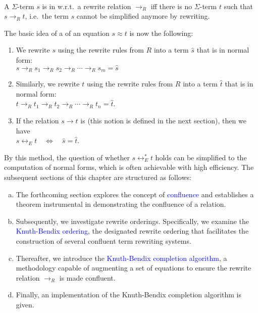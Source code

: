 \begin{Definition} \hspace*{\fill} \\
  A $\Sigma$-term $s$ is in  w.r.t.~a rewrite relation $\rightarrow_R$ iff there is no
  $\Sigma$-term $t$ such that $s \rightarrow_R t$, i.e.~the term $s$ cannot be simplified anymore by rewriting. \eod
\end{Definition}
The basic idea of a  of an equation $s \approx t$ is now the following:
\begin{enumerate}
\item We rewrite $s$ using the rewrite rules from $R$ into a term $\widehat{s}$ that is in normal form:
      \\[0.2cm]
      \hspace*{1.3cm}
      $s \rightarrow_R s_1 \rightarrow_R s_2 \rightarrow_R \cdots \rightarrow_R s_m = \widehat{s}$
\item Similarly, we rewrite $t$ using the rewrite rules from $R$ into a term $\widehat{t}$ that is in normal form:
      \\[0.2cm]
      \hspace*{1.3cm}
      $t \rightarrow_R t_1 \rightarrow_R t_2 \rightarrow_R \cdots \rightarrow_R t_n = \widehat{t}$.
\item If the relation $s \rightarrow t$ is  (this notion is defined in the next section),
      then we have 
      \\[0.2cm]
      \hspace*{1.3cm}
      $s \leftrightarrow_E t \quad \Leftrightarrow \quad \widehat{s} = \widehat{t}$.
    \end{enumerate}
By this method, the question of whether $s \leftrightarrow_E^* t$ holds can be simplified to the computation of
normal forms, which is often achievable with high efficiency. The subsequent sections of this chapter are
structured as follows: 
\begin{enumerate}[(a)]
\item The forthcoming section explores the concept of \textcolor{blue}{confluence} and establishes a theorem
      instrumental in demonstrating the confluence of a relation. 
\item Subsequently, we investigate rewrite orderings. Specifically, we examine the
      \textcolor{blue}{Knuth-Bendix ordering}, the designated rewrite ordering that facilitates the construction of
      several confluent term rewriting systems. 
\item Thereafter, we introduce the \textcolor{blue}{Knuth-Bendix completion algorithm}, a methodology capable
      of augmenting a set of equations to ensure the rewrite relation $\rightarrow_R$ is made confluent. 
\item Finally, an implementation of the Knuth-Bendix completion algorithm is given.
\end{enumerate}


